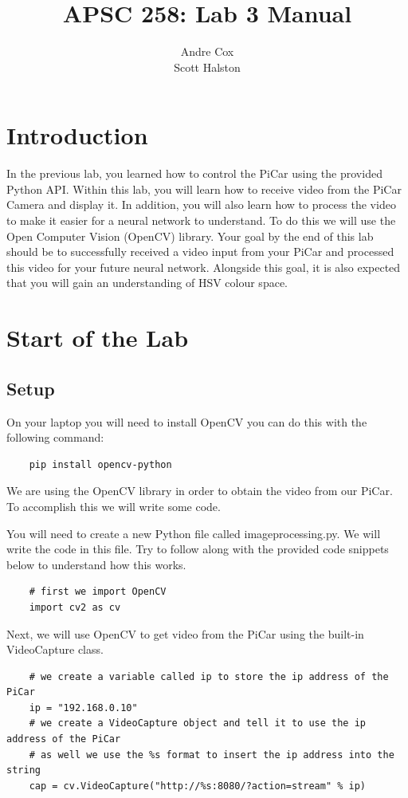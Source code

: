 \documentclass[11pt]{report}
\title{APSC 258: Lab 3 Manual}
\author{Andre Cox \\ Scott Halston}
\begin{document}
\maketitle
\tableofcontents

\clearpage

\chapter{Introduction}
In the previous lab, you learned how to control the PiCar using the provided Python API. Within this lab, you will learn how to receive video from the PiCar Camera and display it. In addition, you will also learn how to process the video to make it easier for a neural network to understand. To do this we will use the Open Computer Vision (OpenCV) library. 
Your goal by the end of this lab should be to successfully received a video input from your PiCar and processed this video for your future neural network. Alongside this goal, it is also expected that you will gain an understanding of HSV colour space.

\chapter{Start of the Lab}
\section{Setup}
On your laptop you will need to install OpenCV you can do this with the following command:
\begin{verbatim}
    pip install opencv-python  
\end{verbatim}

We are using the OpenCV library in order to obtain the video from our PiCar.  To accomplish this we will write some code.

You will need to create a new Python file called imageprocessing.py. We will write the code in this file.
Try to follow along with the provided code snippets below to understand how this works. 

\begin{verbatim}
    # first we import OpenCV 
    import cv2 as cv 
\end{verbatim}

Next, we will use OpenCV to get video from the PiCar using the built-in VideoCapture class.
\begin{verbatim}
    # we create a variable called ip to store the ip address of the PiCar
    ip = "192.168.0.10"
    # we create a VideoCapture object and tell it to use the ip address of the PiCar
    # as well we use the %s format to insert the ip address into the string
    cap = cv.VideoCapture("http://%s:8080/?action=stream" % ip)
\end{verbatim}
\end{document}
